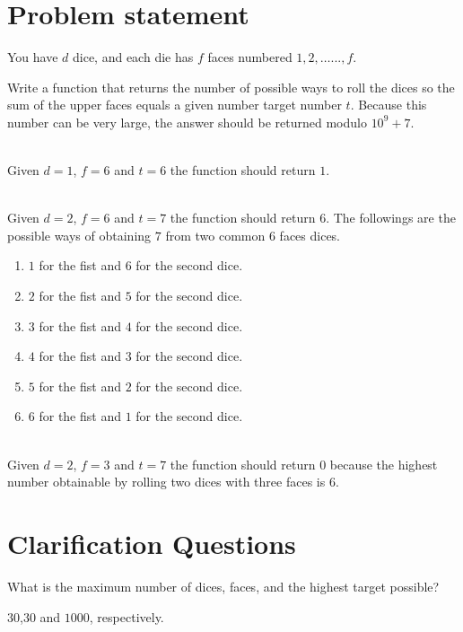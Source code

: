 \section{Problem statement}
\begin{exercise}
You have $d$ dice, and each die has $f$ faces numbered $1, 2, \ldots..., f$.

Write a function that returns the number of possible ways to roll the dices so the sum of the upper faces
equals a given number target number $t$.
Because this number can be very large, the answer should be returned modulo $10^9 + 7$.

	\begin{example}
		\hfill \\
		Given $d=1$, $f=6$ and $t=6$ the function should return $1$.
	\end{example}

	\begin{example}
		\hfill \\
		Given $d=2$, $f=6$ and $t=7$ the function should return $6$. 
		The followings are the possible ways of obtaining $7$ from two common $6$ faces dices.
		\begin{enumerate}
			\item $1$ for the fist and $6$ for the second dice.
			\item $2$ for the fist and $5$ for the second dice.
			\item $3$ for the fist and $4$ for the second dice.
			\item $4$  for the fist and $3$ for the second dice.
			\item $5$  for the fist and $2$ for the second dice.
			\item $6$  for the fist and $1$ for the second dice.
		\end{enumerate}
	\end{example}

	\begin{example}
		\hfill \\
		Given $d=2$, $f=3$ and $t=7$ the function should return $0$ because the highest number obtainable by rolling two dices with three faces is $6$.
	\end{example}
\end{exercise}

\section{Clarification Questions}

\begin{QandA}
	\item What is the maximum number of dices, faces, and the highest target possible?
	\begin{answered}
		$30$,$30$ and $1000$, respectively.
	\end{answered}
	
\end{QandA}

